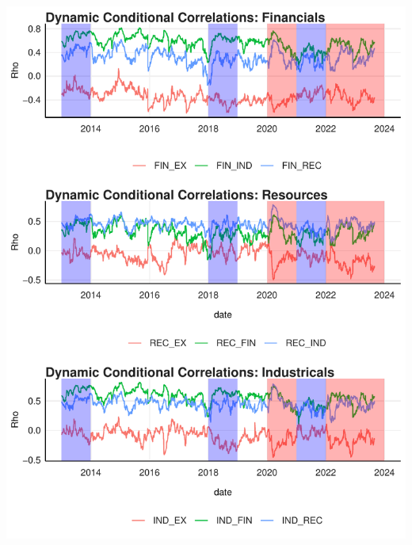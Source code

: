 \documentclass[11pt,preprint, authoryear]{elsarticle}
\let\origfigure\figure
\let\endorigfigure\endfigure
\renewenvironment{figure}[1][2] {
    \expandafter\origfigure\expandafter[H]
} {
    \endorigfigure
}
\numberwithin{equation}{section}
\numberwithin{figure}{section}
\numberwithin{table}{section}
\begin{document}
\begin{figure}[H]

{\centering \includegraphics{WriteUp_files/figure-latex/Figure2-1} 

}

\caption{DCC  \label{Figure2}}\label{fig:Figure2}
\end{figure}
\end{document}
